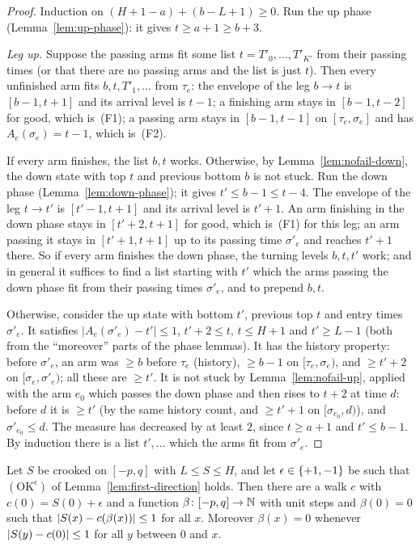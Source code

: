 \begin{proof}
Induction on $(H+1-a)+(b-L+1)\ge0$. Run the up phase (Lemma~\ref{lem:up-phase}): it gives $t\ge a+1\ge b+3$.

\emph{Leg up.} Suppose the passing arms fit some list $t=T'_0,\dots,T'_{K'}$ from their passing times (or that there are no passing
arms and the list is just $t$). Then every unfinished arm fits $b,t,T'_1,\dots$ from $\tau_e$: the envelope of the leg $b\to t$ is
$[b-1,t+1]$ and its arrival level is $t-1$; a finishing arm stays in $[b-1,t-2]$ for good, which is~(F1); a passing arm stays in
$[b-1,t-1]$ on $[\tau_e,\sigma_e]$ and has $A_e(\sigma_e)=t-1$, which is~(F2).

If every arm finishes, the list $b,t$ works. Otherwise, by Lemma~\ref{lem:nofail-down}, the down state with top $t$ and previous
bottom $b$ is not stuck. Run the down phase (Lemma~\ref{lem:down-phase}); it gives $t'\le b-1\le t-4$. The envelope of the leg
$t\to t'$ is $[t'-1,t+1]$ and its arrival level is $t'+1$. An arm finishing in the down phase stays in $[t'+2,t+1]$ for good,
which is~(F1) for this leg; an arm passing it stays in $[t'+1,t+1]$ up to its passing time $\sigma'_e$ and reaches $t'+1$ there. So
if every arm finishes the down phase, the turning levels $b,t,t'$ work; and in general it suffices to find a list starting with $t'$
which the arms passing the down phase fit from their passing times $\sigma'_e$, and to prepend $b,t$.

Otherwise, consider the up state with bottom $t'$, previous top $t$ and entry times $\sigma'_e$. It satisfies $|A_e(\sigma'_e)-t'|\le1$,
$t'+2\le t$, $t\le H+1$ and $t'\ge L-1$ (both from the ``moreover'' parts of the phase lemmas). It has the history property: before
$\sigma'_e$, an arm was $\ge b$ before $\tau_e$ (history), $\ge b-1$ on $[\tau_e,\sigma_e)$, and $\ge t'+2$ on $[\sigma_e,\sigma'_e)$;
all these are $\ge t'$. It is not stuck by Lemma~\ref{lem:nofail-up}, applied with the arm $e_0$ which passes the down phase and then
rises to $t+2$ at time $d$: before $d$ it is $\ge t'$ (by the same history count, and $\ge t'+1$ on $[\sigma_{e_0},d)$), and
$\sigma'_{e_0}\le d$. The measure has decreased by at least $2$, since $t\ge a+1$ and $t'\le b-1$. By induction there is a list
$t',\dots$ which the arms fit from $\sigma'_e$.
\end{proof}


\begin{theorem}\label{thm:zigzag}
Let $S$ be crooked on $[-p,q]$ with $L\le S\le H$, and let $\epsilon\in\left\{ +1,-1 \right\}$ be such that $(\mathrm{OK}^\epsilon)$ of
Lemma~\ref{lem:first-direction} holds. Then there are a walk $c$ with $c(0)=S(0)+\epsilon$ and a function $\beta\colon[-p,q]\to\mathbb{N}$ with
unit steps and $\beta(0)=0$ such that $\left\lvert S(x)-c(\beta(x))\right\rvert\le1$ for all $x$. Moreover $\beta(x)=0$ whenever $\left\lvert S(y)-c(0)\right\rvert\le1$ for
all $y$ between $0$ and $x$.
\end{theorem}

